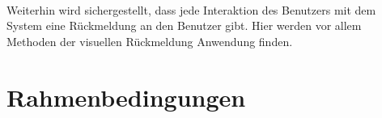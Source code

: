 \paragraph{}
Weiterhin wird sichergestellt, dass jede Interaktion des Benutzers mit dem System eine Rückmeldung an den Benutzer gibt. Hier werden vor allem Methoden der visuellen Rückmeldung Anwendung finden.

\section{Rahmenbedingungen}

